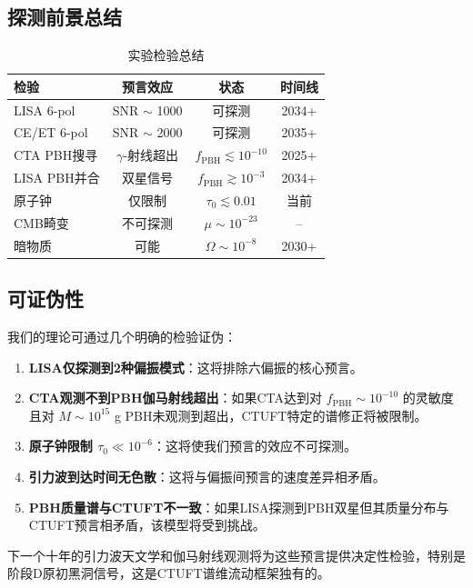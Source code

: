 \subsection{探测前景总结}

\begin{table}[htbp]
\centering
\caption{实验检验总结}
\label{tab:detection_summary}
\begin{tabular}{lccc}
\hline
\textbf{检验} & \textbf{预言效应} & \textbf{状态} & \textbf{时间线} \\
\hline
LISA 6-pol & SNR $\sim$ 1000 & 可探测 & 2034+ \\
CE/ET 6-pol & SNR $\sim$ 2000 & 可探测 & 2035+ \\
CTA PBH搜寻 & $\gamma$-射线超出 & $f_{\text{PBH}} \lesssim 10^{-10}$ & 2025+ \\
LISA PBH并合 & 双星信号 & $f_{\text{PBH}} \gtrsim 10^{-3}$ & 2034+ \\
原子钟 & 仅限制 & $\tau_0 \lesssim 0.01$ & 当前 \\
CMB畸变 & 不可探测 & $\mu \sim 10^{-23}$ & -- \\
暗物质 & 可能 & $\Omega \sim 10^{-8}$ & 2030+ \\
\hline
\end{tabular}
\end{table}

\subsection{可证伪性}

我们的理论可通过几个明确的检验证伪：

\begin{enumerate}
    \item \textbf{LISA仅探测到2种偏振模式}：这将排除六偏振的核心预言。
    
    \item \textbf{CTA观测不到PBH伽马射线超出}：如果CTA达到对 $f_{\text{PBH}} \sim 10^{-10}$ 的灵敏度且对 $M \sim 10^{15}$ g PBH未观测到超出，CTUFT特定的谱修正将被限制。
    
    \item \textbf{原子钟限制 $\tau_0 \ll 10^{-6}$}：这将使我们预言的效应不可探测。
    
    \item \textbf{引力波到达时间无色散}：这将与偏振间预言的速度差异相矛盾。
    
    \item \textbf{PBH质量谱与CTUFT不一致}：如果LISA探测到PBH双星但其质量分布与CTUFT预言相矛盾，该模型将受到挑战。
\end{enumerate}

下一个十年的引力波天文学和伽马射线观测将为这些预言提供决定性检验，特别是阶段D原初黑洞信号，这是CTUFT谱维流动框架独有的。
